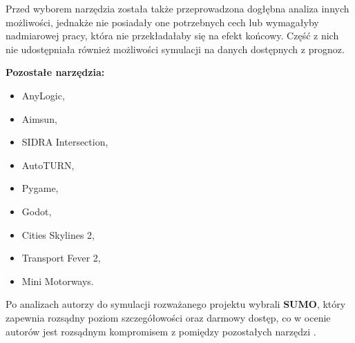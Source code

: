 \documentclass[polish]{projectreport}
\begin{document}
Przed wyborem narzędzia została także przeprowadzona dogłębna analiza innych możliwości, jednakże nie posiadały one potrzebnych cech lub wymagałyby nadmiarowej pracy, która nie przekładałaby się na efekt końcowy. Część z nich nie udostępniała również możliwości symulacji na danych dostępnych z prognoz. \\

\newpage

\noindent \textbf{Pozostałe narzędzia:}

\begin{itemize}
    \item AnyLogic,
    \item Aimsun,
    \item SIDRA Intersection,
    \item AutoTURN,
    \item Pygame,
    \item Godot,
    \item Cities Skylines 2,
    \item Transport Fever 2,
    \item Mini Motorways.
\end{itemize}

Po analizach autorzy do symulacji rozważanego projektu wybrali \textbf{SUMO}, który zapewnia rozsądny poziom szczegółowości oraz darmowy dostęp, co w ocenie autorów jest rozsądnym kompromisem z pomiędzy pozostałych narzędzi \cite{sumo_page}. 


\end{document}
